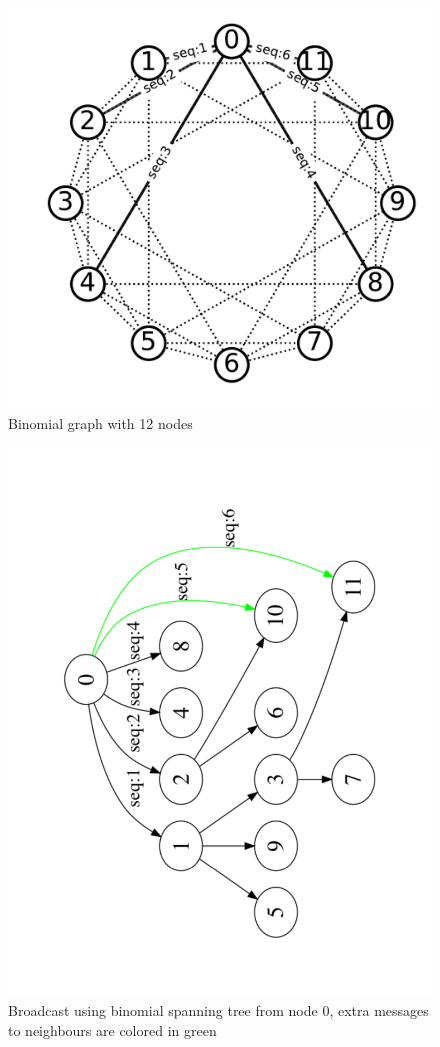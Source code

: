 \documentclass[sigconf]{acmart}
\begin{document}
\begin{figure}
  \centering
  \includegraphics[width=\linewidth]{BMG_seq.pdf}
  \caption{Binomial graph with 12 nodes}
\end{figure}
\begin{figure}
  \centering
  \includegraphics[trim=0.2cm 0.4cm 0.2cm 0.2cm, width=0.9\linewidth,angle=270]{reoder_span.pdf}
  \caption{Broadcast using binomial spanning tree from node 0, extra messages to neighbours are colored in green }
\end{figure}
\end{document}
